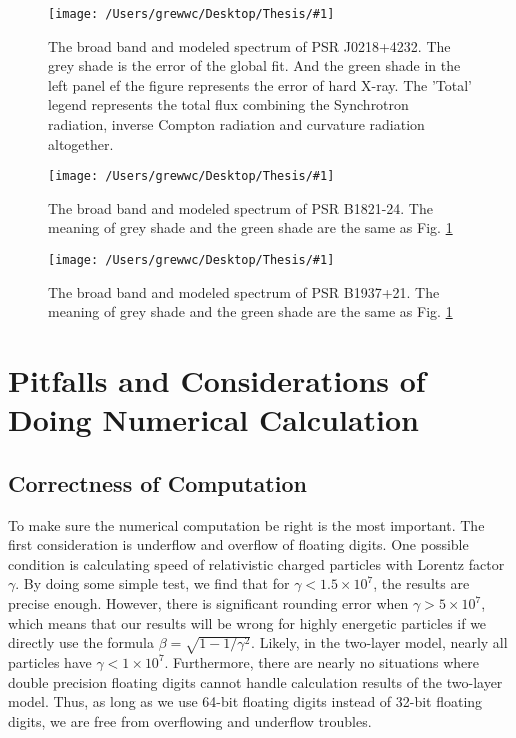 \documentclass[12pt]{report}
\newcommand{\singleFig}[3]{
  \begin{figure}[!ht]
    \centering
    \texttt{[image: /Users/grewwc/Desktop/Thesis/\#1]}
    \caption{#3}
    \label{fig: #1}
  \end{figure}
}
\begin{document}
        \singleFig{j0218_twolayer_all.png}{0.39}{The broad band and modeled spectrum of PSR J0218+4232.
          The grey shade is the error of the global fit. And the green shade in the left panel ef the 
          figure represents the error of hard X-ray. The 'Total' legend represents the total flux 
          combining the Synchrotron radiation, inverse Compton radiation and curvature radiation
          altogether.}
        \vspace{0.5cm} 
        
        \singleFig{b1821_twolayer_all.png}{0.4}{The broad band and modeled spectrum of PSR B1821-24.
          The meaning of grey shade and the green shade are the same as Fig. \ref{fig: j0218_twolayer_all.png}}
        \vspace{0.5cm} 
          
        \singleFig{j1939_twolayer_all.png}{0.39}{The broad band and modeled spectrum of PSR B1937+21.
          The meaning of grey shade and the green shade are the same as Fig.
          \ref{fig: j0218_twolayer_all.png}}
        \vspace{0.5cm}
        
      \section{Pitfalls and Considerations of Doing Numerical Calculation}
        \subsection{Correctness of Computation}
          To make sure the numerical computation be right is the most important. 
          The first consideration is underflow and overflow of floating digits.
          One possible condition is calculating speed of relativistic charged particles with 
          Lorentz factor $\gamma$. By doing some simple test, we find that for 
          $\gamma < 1.5\times 10^7$, the results are precise enough. However, there is significant rounding error
          when $\gamma > 5\times 10^7$, which means that our results will be wrong for highly 
          energetic particles if we directly use the formula $\beta = \sqrt{1 - 1/\gamma^2}$.
          Likely, in the two-layer model, nearly all particles have $\gamma < 1\times 10^7$. 
          Furthermore, there are nearly no situations where double precision floating digits
          cannot handle calculation results of the two-layer model. Thus, as long as we use 
          64-bit floating digits instead of 32-bit floating digits, we are free from overflowing and 
          underflow troubles. 
            
\end{document}
